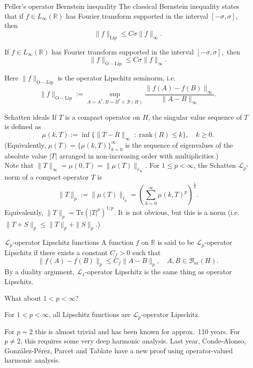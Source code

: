 \documentclass{beamer}
\numberwithin{equation}{section}
\theoremstyle{plain}
\theoremstyle{plain}
\theoremstyle{definition}
\theoremstyle{plain}
\theoremstyle{plain}
\theoremstyle{definition}
\newcommand{\Rl}{\mathbb{R}}
\newcommand{\Bc}{\mathcal{B}}
\newcommand{\Lc}{\mathcal{L}}
\newcommand{\Tr}{\mathrm{Tr}}
\newcommand{\sa}{\mathrm{sa}}
\begin{document}
\begin{frame}{Peller's operator Bernstein inequality}
    The classical Bernstein inequality states that if $f \in L_{\infty}(\Rl)$ has Fourier transform supported in the interval $[-\sigma,\sigma],$ then
    \[
        \|f\|_{\mathrm{Lip}} \leq C\sigma \|f\|_{\infty}.
    \]
    \begin{theorem}[Peller (1990)]
        If $f \in L_{\infty}(\Rl)$ has Fourier transform supported in the interval $[-\sigma,\sigma],$ then
        \[
            \|f\|_{\mathrm{O-Lip}} \leq C\sigma\|f\|_\infty.
        \]
    \end{theorem}
    Here $\|f\|_{\mathrm{O-Lip}}$ is the operator Lipschitz seminorm, i.e.
    \[
        \|f\|_{\mathrm{O-Lip}} := \sup_{A=A^*,B=B^*\in \Bc(H)} \frac{\|f(A)-f(B)\|_{\infty}}{\|A-B\|_{\infty}}.
    \]
\end{frame}

\begin{frame}{Schatten ideals}
    If $T$ is a compact operator on $H$, the singular value sequence of $T$ is defined as
    $$
        \mu(k,T) := \inf\{\|T-R\|_{\infty}\;:\;\mathrm{rank}(R)\leq k\},\quad k\geq 0.
    $$
    (Equivalently, $\mu(T) = \{\mu(k,T)\}_{k=0}^\infty$ is the sequence of eigenvalues of the absolute value $|T|$ arranged in non-increasing order with multiplicities.)\\
    \pause
    Note that $\|T\|_\infty = \mu(0,T) = \|\mu(T)\|_{\ell_\infty}.$
    \pause
    For $1\leq p < \infty$, the Schatten $\Lc_p$-norm of a compact operator $T$ is
    $$
        \|T\|_p := \|\mu(T)\|_{\ell_p} = \left(\sum_{k=0}^\infty \mu(k,T)^p\right)^{\frac1p}.
    $$
    Equivalently, $\|T\|_p = \Tr(|T|^p)^{1/p}.$
    It is not obvious, but this is a norm (i.e. $\|T+S\|_p\leq \|T\|_p+\|S\|_p.$)
\end{frame}

\begin{frame}{$\Lc_p$-operator Lipschitz functions}
    A function $f$ on $\Rl$ is said to be $\Lc_p$-operator Lipschitz if there exists a constant $C_f>0$ such that
    $$
        \|f(A)-f(B)\|_p \leq C_f\|A-B\|_p,\quad A,B \in \Bc_{\sa}(H).
    $$
    By a duality argument, $\Lc_1$-operator Lipschitz is the same thing as operator Lipschitz.\pause
    
    What about $1 < p < \infty$?\pause
    \begin{theorem}
        For $1 < p < \infty$, all Lipschitz functions are $\Lc_p$-operator Lipschitz.
    \end{theorem}   
    \pause
    For $p=2$ this is almost trivial and has been known for approx.~110 years. For $p\neq 2$, this requires some very deep
    harmonic analysis. \pause
    Last year, Conde-Alonso, Gonz\'alez-P\'erez, Parcet and Tablate have a new proof using operator-valued harmonic analysis.
\end{frame}
\end{document}
